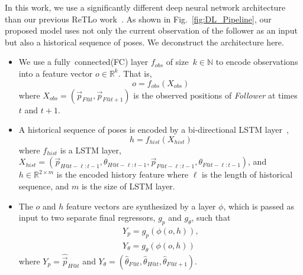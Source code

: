 \documentclass[letterpaper, 10 pt, conference]{ieeeconf}  %
\begin{document}
    In this work, we use a significantly different deep neural network
    architecture than our previous ReTLo work~\cite{CPR17}. As shown in
    Fig.~\ref{fig:DL_Pipeline}, our proposed model uses not only the
    current observation of the follower as an input but also a
    historical sequence of poses. We deconstruct the architecture here.
    \begin{itemize}
        \item We use a fully~connected(FC) layer $f_{obs}$ of size~$k
            \in \mathbb{N}$ to encode
            observations into a feature vector $o \in \mathbb{R}^k$.
            That is,
            \begin{equation}
                o = f_{obs}(X_{obs})
            \end{equation}
            where $X_{obs} = (\vec{p}_{F@t},\vec{p}_{F@t+1})$ is the
            observed positions of \emph{Follower} at times $t$ and $t+1$.

        \item A historical sequence of poses is encoded by a
            bi-directional LSTM layer~\cite{Wu16},
            \begin{equation}
                h = f_{hist}(X_{hist})
            \end{equation}
            where $f_{hist}$ is a LSTM layer, $X_{hist} =
            (\vec{p}_{H@t-\ell:t-1}, \theta_{H@t-\ell:t-1},
            \vec{p}_{F@t-\ell:t-1}, \theta_{F@t-\ell:t-1})$, and $h \in
            \mathbb{R}^{2 \times m}$ is the encoded history feature
            where $\ell$ is the length of historical sequence, and $m$ is
            the size of LSTM layer.

        \item The $o$ and $h$ feature vectors are synthesized by a layer
           $\phi$, which is passed as input to two separate final
           regressors, $g_{p}$ and $g_\theta$, such that
            \begin{equation}
                \begin{split}
                Y_{p} = g_{p}(\phi(o, h)),\\
                Y_{\theta}= g_{\theta}(\phi(o, h))
                \end{split}
                \label{eq:regression_output}
            \end{equation}
            where $Y_{p} = \hat{\vec{p}}_{H@t}$ and $Y_{\theta} =
            (\hat{\theta}_{F@t}, \hat{\theta}_{H@t},
            \hat{\theta}_{F@t+1})$.


\end{itemize}
\end{document}
